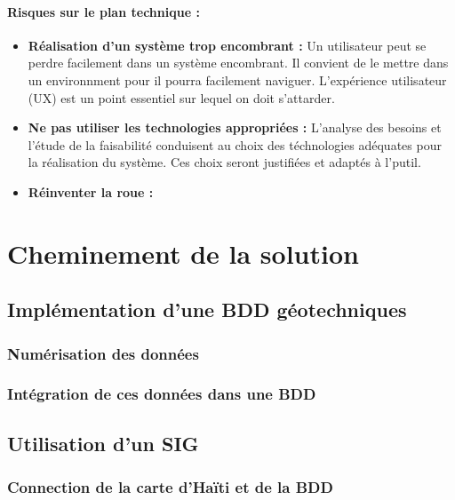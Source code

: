         \paragraph{Risques sur le plan technique :}
        \begin{itemize}
            \item \textbf{Réalisation d'un système trop encombrant :}
            Un utilisateur peut se perdre facilement dans un système encombrant. Il convient de le mettre dans un environnment
            pour il pourra facilement naviguer. L'expérience utilisateur (UX) est un point essentiel sur lequel on doit s'attarder.
            \item \textbf{Ne pas utiliser les technologies appropriées :}
            L'analyse des besoins et l'étude de la faisabilité conduisent au choix des téchnologies adéquates pour la réalisation
            du système. Ces choix seront justifiées et adaptés à l'putil.
            \item \textbf{Réinventer la roue :}
        \end{itemize}


    \section{Cheminement de la solution}
        \subsection{Implémentation d'une BDD géotechniques}
            \subsubsection{Numérisation des données}
                
            \subsubsection{Intégration de ces données dans une BDD}
                
        \subsection{Utilisation d'un SIG}
            \subsubsection{Connection de la carte d'Haïti et de la BDD}
                
